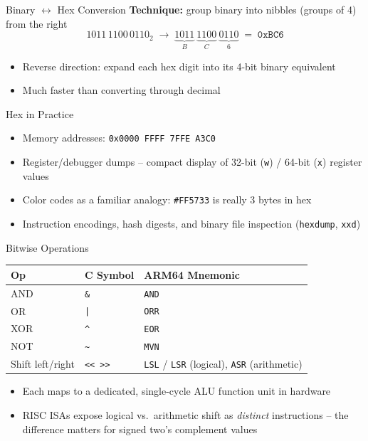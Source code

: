 \documentclass[10pt, aspectratio=169]{beamer}
\begin{document}
\begin{frame}{Binary $\leftrightarrow$ Hex Conversion}
\textbf{Technique:} group binary into nibbles (groups of 4) from the right
\[
1011\,1100\,0110_2 \;\rightarrow\; \underbrace{1011}_{B}\ \underbrace{1100}_{C}\ \underbrace{0110}_{6} \;=\; \texttt{0xBC6}
\]
\begin{itemize}
    \item Reverse direction: expand each hex digit into its 4-bit binary equivalent
    \item Much faster than converting through decimal
\end{itemize}
\end{frame}

\begin{frame}{Hex in Practice}
\begin{itemize}
    \item Memory addresses: \texttt{0x0000\,FFFF\,7FFE\,A3C0}
    \item Register/debugger dumps -- compact display of 32-bit (\texttt{w}) / 64-bit (\texttt{x}) register values
    \item Color codes as a familiar analogy: \texttt{\#FF5733} is really 3 bytes in hex
    \item Instruction encodings, hash digests, and binary file inspection (\texttt{hexdump}, \texttt{xxd})
\end{itemize}
\end{frame}

\begin{frame}{Bitwise Operations}
\begin{center}
\begin{tabular}{l l l}
\textbf{Op} & \textbf{C Symbol} & \textbf{ARM64 Mnemonic} \\
\hline
AND & \texttt{\&} & \texttt{AND} \\
OR  & \texttt{|} & \texttt{ORR} \\
XOR & \texttt{\^{}} & \texttt{EOR} \\
NOT & \texttt{\~{}} & \texttt{MVN} \\
Shift left/right & \texttt{<<}\ \texttt{>>} & \texttt{LSL} / \texttt{LSR} (logical), \texttt{ASR} (arithmetic) \\
\end{tabular}
\end{center}
\begin{itemize}
    \item Each maps to a dedicated, single-cycle ALU function unit in hardware
    \item RISC ISAs expose logical vs.\ arithmetic shift as \emph{distinct} instructions -- the difference matters for signed two's complement values
\end{itemize}
\end{frame}
\end{document}

